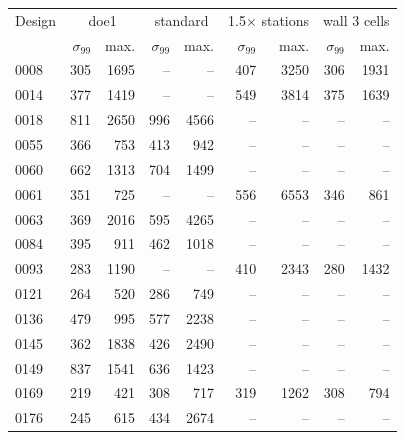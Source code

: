 \begin{tabular}{@{}lrrrrrrrr@{}}\toprule
Design & \multicolumn{2}{c}{doe1} & \multicolumn{2}{c}{standard} & \multicolumn{2}{c}{1.5× stations} & \multicolumn{2}{c}{wall 3 cells} \\
  & $\sigma_{99}$ & max. & $\sigma_{99}$ & max. & $\sigma_{99}$ & max. & $\sigma_{99}$ & max. \\\midrule
0008 & \num{305} & \num{1695} & -- & -- & \num{407} & \num{3250} & \num{306} & \num{1931} \\
0014 & \num{377} & \num{1419} & -- & -- & \num{549} & \num{3814} & \num{375} & \num{1639} \\
0018 & \num{811} & \num{2650} & \num{996} & \num{4566} & -- & -- & -- & -- \\
0055 & \num{366} & \num{753} & \num{413} & \num{942} & -- & -- & -- & -- \\
0060 & \num{662} & \num{1313} & \num{704} & \num{1499} & -- & -- & -- & -- \\
0061 & \num{351} & \num{725} & -- & -- & \num{556} & \num{6553} & \num{346} & \num{861} \\
0063 & \num{369} & \num{2016} & \num{595} & \num{4265} & -- & -- & -- & -- \\
0084 & \num{395} & \num{911} & \num{462} & \num{1018} & -- & -- & -- & -- \\
0093 & \num{283} & \num{1190} & -- & -- & \num{410} & \num{2343} & \num{280} & \num{1432} \\
0121 & \num{264} & \num{520} & \num{286} & \num{749} & -- & -- & -- & -- \\
0136 & \num{479} & \num{995} & \num{577} & \num{2238} & -- & -- & -- & -- \\
0145 & \num{362} & \num{1838} & \num{426} & \num{2490} & -- & -- & -- & -- \\
0149 & \num{837} & \num{1541} & \num{636} & \num{1423} & -- & -- & -- & -- \\
0169 & \num{219} & \num{421} & \num{308} & \num{717} & \num{319} & \num{1262} & \num{308} & \num{794} \\
0176 & \num{245} & \num{615} & \num{434} & \num{2674} & -- & -- & -- & -- \\
\bottomrule\end{tabular}
